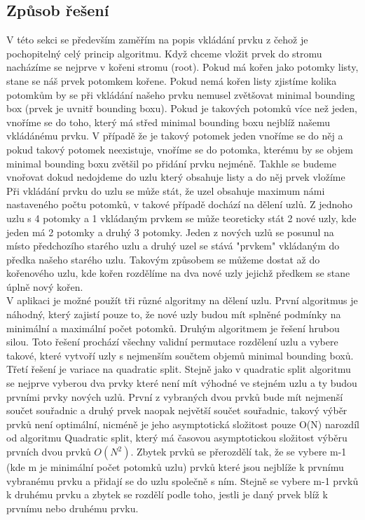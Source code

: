 \documentclass[12pt,a4paper]{article}
\begin{document}
\subsection*{Způsob řešení}
V této sekci se především zaměřím na popis vkládání prvku z čehož je pochopitelný celý princip algoritmu. Když chceme vložit prvek do stromu nacházíme se nejprve v kořeni stromu (root). Pokud má kořen jako potomky listy, stane se náš prvek potomkem kořene. Pokud nemá kořen listy zjistíme kolika potomkům by se při vkládání našeho prvku nemusel zvětšovat minimal bounding box (prvek je uvnitř bounding boxu). Pokud je takových potomků více než jeden, vnoříme se do toho, který má střed minimal bounding boxu nejblíž našemu vkládánému prvku. V případě že je takový potomek jeden vnoříme se do něj a pokud takový potomek neexistuje, vnoříme se do potomka, kterému by se objem minimal bounding boxu zvětšil po přidání prvku nejméně. Takhle se budeme vnořovat dokud nedojdeme do uzlu který obsahuje listy a do něj prvek vložíme\\[0.6cm]

Při vkládání prvku do uzlu se může stát, že uzel obsahuje maximum námi nastaveného počtu potomků, v takové případě dochází na dělení uzlů. Z jednoho uzlu s 4 potomky a 1 vkládaným prvkem se může teoreticky stát 2 nové uzly, kde jeden má 2 potomky a druhý 3 potomky. Jeden z nových uzlů se posunul na místo předchozího starého uzlu a druhý uzel se stává "prvkem" vkládaným do předka našeho starého uzlu. Takovým způsobem se můžeme dostat až do kořenového uzlu, kde kořen rozdělíme na dva nové uzly jejichž předkem se stane úplně nový kořen.\\[0.6cm]

V aplikaci je možné použít tři různé algoritmy na dělení uzlu. První algoritmus je náhodný, který zajistí pouze to, že nové uzly budou mít splněné podmínky na minimální a maximální počet potomků. Druhým algoritmem je řešení hrubou silou. Toto řešení prochází všechny validní permutace rozdělení uzlu a vybere takové, které vytvoří uzly s nejmenším součtem objemů minimal bounding boxů. Třetí řešení je variace\cite{nodeSplitting} na quadratic split. Stejně jako v quadratic split algoritmu se nejprve vyberou dva prvky které není mít výhodné ve stejném uzlu a ty budou prvními prvky nových uzlů. První z vybraných dvou prvků bude mít nejmenší součet souřadnic a druhý prvek naopak největší součet souřadnic, takový výběr prvků není optimální, nicméně je jeho asymptotická složitost pouze O(N) narozdíl od algoritmu Quadratic split, který má časovou asymptotickou složitost výběru prvních dvou prvků $O(N^2)$\cite{original}. Zbytek prvků se přerozdělí tak, že se vybere m-1 (kde m je minimální počet potomků uzlu) prvků které jsou nejblíže k prvnímu vybranému prvku a přidají se do uzlu společně s ním. Stejně se vybere m-1 prvků k druhému prvku a zbytek se rozdělí podle toho, jestli je daný prvek blíž k prvnímu nebo druhému prvku.\\[0.6cm]
\end{document}
